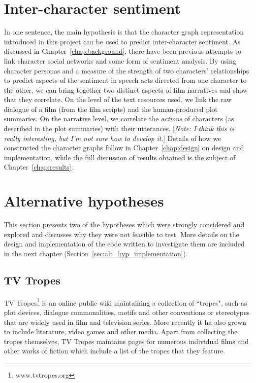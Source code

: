 \documentclass[bsc,frontabs,singlespacing,parskip, twoside]{infthesis}
\begin{document}
\section{Inter-character sentiment}
In one sentence, the main hypothesis is that the character graph representation introduced in this project can be used to predict inter-character sentiment. As discussed in Chapter~\ref{chap:background}, there have been previous attempts to link character social networks and some form of sentiment analysis. By using character personas and a measure of the strength of two characters' relationships to predict aspects of the sentiment in speech acts directed from one character to the other, we can bring together two distinct aspects of film narratives and show that they correlate. On the level of the text resources used, we link the raw dialogue of a film (from the film scripts) and the human-produced plot summaries. On the narrative level, we correlate the \textit{actions} of characters (as described in the plot summaries) with their utterances. [\textit{Note: I think this is really interesting, but I'm not sure how to develop it.}] Details of how we constructed the character graphs follow in Chapter~\ref{chap:design} on design and implementation, while the full discussion of results obtained is the subject of Chapter~\ref{chap:results}.

\section{Alternative hypotheses}

This section presents two of the hypotheses which were strongly considered and explored and discusses why they were not feasible to test. More details on the design and implementation of the code written to investigate them are included in the next chapter (Section~\ref{sec:alt_hyp_implementation}).

\subsection{TV Tropes}
\label{sec:alt_tropes}
TV Tropes\footnote{www.tvtropes.org} is an online public wiki maintaining a collection of ``tropes", such as plot devices, dialogue commonalities, motifs and other conventions or stereotypes that are widely used in film and television series. More recently it ha also grown to include literature, video games and other media. Apart from collecting the tropes themselves, TV Tropes maintains pages for numerous individual films and other works of fiction which include a list of the tropes that they feature.
\end{document}
